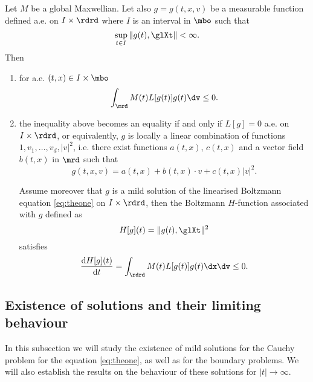 \begin{theorem}
	\label{th:H} Let $M$ be a global Maxwellian. Let  also $g=g(t,x,v)$ be a measurable function defined a.e. on $I\times\rdrd$ where $I$ is an interval in $\mbo$ such that 
	\[\sup_{t\in I} \|g(t),\glXt\|< \infty.\]
	Then
	\begin{enumerate}
		\item for a.e. $(t,x)\in I\times\mbo$
		\[\int_{\mrd}  M(t)L[g(t)]g(t)\dv\le 0.\]
		\item the inequality above becomes an equality if and only if $L[g]=0$ a.e. on $I\times\rdrd$, or equivalently, $g$ is locally a linear combination of functions $1,v_1,\ldots,v_d,|v|^2$, i.e. there exist functions $a(t,x)$, $c(t,x)$ and a vector field $b(t,x)$ in $\mrd$ such that
		\[g(t,x,v) = a(t,x)+b(t,x)\cdot v+c(t,x)|v|^2.\]

		Assume moreover that $g$ is a mild solution of the linearised Boltzmann equation \eqref{eq:theone} on $I\times\rdrd$, then the Boltzmann $H$-function associated with $g$ defined as 
		\[H[g](t) = \|g(t),\glXt\|^2\]
		satisfies
		\[\frac{\mathrm d H[g](t)}{\mathrm dt}=\int_{\rdrd} M(t)L[g(t)]g(t)\dx\dv\le 0.\]
	\end{enumerate}
\end{theorem}

\subsection{Existence of solutions and their limiting behaviour} %
\label{sub:existence_of_solutions}
In this subsection we will study the existence of mild solutions for the Cauchy problem for the equation \eqref{eq:theone}, as well as  for the boundary problems. We will also establish the results on the  behaviour of these solutions for $|t|\to \infty$.

